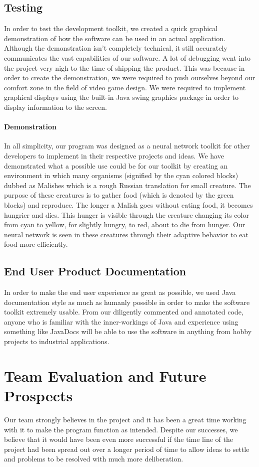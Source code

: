 \documentclass[letterpaper, 10pt]{article}
\begin{document}
	\subsection{Testing}
		In order to test the development toolkit, we created a quick graphical demonstration of how the software can be used in an actual application. Although the demonstration isn't completely technical, it still accurately communicates the vast capabilities of our software. A lot of debugging went into the project very nigh to the time of shipping the product. This was because in order to create the demonstration, we were required to push ourselves beyond our comfort zone in the field of video game design. We were required to implement graphical displays using the built-in Java swing graphics package in order to display information to the screen.
		\paragraph{Demonstration} In all simplicity, our program was designed as a neural network toolkit for other developers to implement in their respective projects and ideas. We have demonstrated what a possible use could be for our toolkit by creating an environment in which many organisms (signified by the cyan colored blocks) dubbed as Malishes which is a rough Russian translation for small creature. The purpose of these creatures is to gather food (which is denoted by the green blocks) and reproduce. The longer a Malish goes without eating food, it becomes hungrier and dies. This hunger is visible through the creature changing its color from cyan to yellow, for slightly hungry, to red, about to die from hunger. Our neural network is seen in these creatures through their adaptive behavior to eat food more efficiently.  
	\subsection{End User Product Documentation}
		In order to make the end user experience as great as possible, we used Java documentation style as much as humanly possible in order to make the software toolkit extremely usable. From our diligently commented and annotated code, anyone who is familiar with the inner-workings of Java and experience using something like JavaDocs will be able to use the software in anything from hobby projects to industrial applications.
\section{Team Evaluation and Future Prospects}
	Our team strongly believes in the project and it has been a great time working with it to make the program function as intended. Despite our successes, we believe that it would have been even more successful if the time line of the project had been spread out over a longer period of time to allow ideas to settle and problems to be resolved with much more deliberation.
\cleardoublepage
\end{document}
